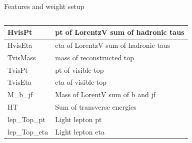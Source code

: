 \documentclass[10pt, UKenglish]{beamer}
\begin{document}
\begin{frame}{Features and weight setup}
\begin{columns}
\begin{column}{0.5\textwidth}
{\begin{tabular}{|l|l|}
                 HvisPt           & pt of LorentzV sum of hadronic taus      \\ \hline
                 HvisEta          & eta of LorentzV sum of hadronic taus      \\ \hline
                 TvisMass         & mass of reconstructed top             \\ \hline
                 TvisPt           & pt of visible top                     \\ \hline
                 TvisEta          & eta of visible top                    \\ \hline
                 M\_b\_jf         & Mass of LorentV sum of b and jf       \\ \hline
                 HT               & Sum of transverse energies            \\ \hline
                 lep\_Top\_pt     & Light lepton pt                       \\ \hline
                 lep\_Top\_eta    & Light lepton eta                      \\ \hline
             \end{tabular}}
        \end{column}
    \end{columns}
\end{frame}
  
\end{document}
